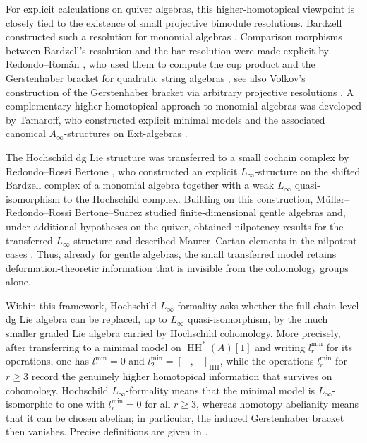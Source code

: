 \documentclass[11pt,a4paper,reqno]{amsart}
\newcommand{\HH}{\operatorname{HH}}
\theoremstyle{plain}
\theoremstyle{definition}
\numberwithin{equation}{section}
\begin{document}
	For explicit calculations on quiver algebras, this higher-homotopical
	viewpoint is closely tied to the existence of small projective bimodule
	resolutions.  Bardzell constructed such a resolution for monomial algebras
	\cite{Bar97}.  Comparison morphisms between Bardzell's resolution and the bar
	resolution were made explicit by Redondo--Rom\'an \cite{RR18a}, who used them
	to compute the cup product and the Gerstenhaber bracket for quadratic string
	algebras \cite{RR18b}; see also Volkov's construction of the Gerstenhaber
	bracket via arbitrary projective resolutions \cite{Vol19}.  A complementary
	higher-homotopical approach to monomial algebras was developed by Tamaroff,
	who constructed explicit minimal models and the associated canonical
	$A_\infty$-structures on Ext-algebras \cite{Tam21}.
	
	The Hochschild dg Lie structure was transferred to a small cochain complex by
	Redondo--Rossi Bertone \cite{RR22}, who constructed an explicit
	$L_\infty$-structure on the shifted Bardzell complex of a monomial algebra
	together with a weak $L_\infty$ quasi-isomorphism to the Hochschild complex.
	Building on this construction, M\"uller--Redondo--Rossi Bertone--Suarez
	studied finite-dimensional gentle algebras and, under additional hypotheses
	on the quiver, obtained nilpotency results for the transferred
	$L_\infty$-structure and described Maurer--Cartan elements in the nilpotent
	cases \cite{MRRS25}.  Thus, already for gentle algebras, the small transferred
	model retains deformation-theoretic information that is invisible from the
	cohomology groups alone.
	
	Within this framework, Hochschild $L_\infty$-formality asks whether the full
	chain-level dg Lie algebra can be replaced, up to $L_\infty$
	quasi-isomorphism, by the much smaller graded Lie algebra carried by Hochschild
	cohomology.  More precisely, after transferring to a minimal model on
	$\HH^*(A)[1]$ and writing $l_r^{\min}$ for its operations, one has
	$l_1^{\min}=0$ and $l_2^{\min}=[-,-]_{\HH}$, while the operations
	$l_r^{\min}$ for $r\geq3$ record the genuinely higher homotopical information
	that survives on cohomology.  Hochschild $L_\infty$-formality means that the
	minimal model is $L_\infty$-isomorphic to one with $l_r^{\min}=0$ for all
	$r\geq3$, whereas homotopy abelianity means that it can be chosen abelian; in
	particular, the induced Gerstenhaber bracket then vanishes.  Precise
	definitions are given in .
	
\end{document}
